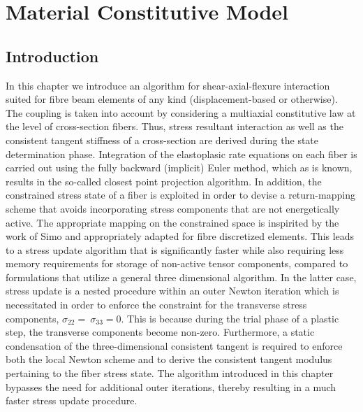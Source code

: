\chapter{Material Constitutive Model}

\section{Introduction}\label{section:CH3-S1}

In this chapter we introduce an algorithm for shear-axial-flexure interaction 
suited for fibre beam elements of any kind (displacement-based or otherwise). 
The coupling is taken into account by considering a multiaxial constitutive law 
at the level of cross-section fibers. Thus, stress resultant interaction as 
well as the consistent tangent stiffness of a cross-section are derived during 
the state determination phase. Integration of the elastoplasic rate equations 
on each fiber is carried out using the fully backward (implicit) Euler method, 
which as is known, results in the so-called closest point projection algorithm. 
In addition, the constrained stress state of a fiber is exploited in order to 
devise a return-mapping scheme that avoids incorporating stress components that 
are not energetically active. The appropriate mapping on the constrained space 
is inspirited by the work of Simo\cite{Simo1986} and appropriately adapted for 
fibre 
discretized elements. This leads to a stress update algorithm that is 
significantly faster while also requiring less memory requirements for storage 
of non-active tensor components, compared to formulations that utilize a 
general three 
dimensional 
algorithm\cite{Papachristidis2010,Saritas2009,Ceresa2009,Gregori2007,Kagermanov2017}.
 In the latter case, stress update is a nested 
procedure within an outer Newton iteration which is necessitated in order to 
enforce the constraint for the transverse stress components, $\sigma_{22}=\ 
\sigma_{33}=0$. This is because during the trial phase of a plastic step, the 
transverse components become non-zero. Furthermore, a static condensation of 
the three-dimensional consistent tangent is required to enforce both the local 
Newton scheme and to derive the consistent tangent modulus pertaining to the 
fiber stress state. The algorithm introduced in this chapter bypasses the need 
for additional outer iterations, thereby resulting in a much faster stress 
update 
procedure.

